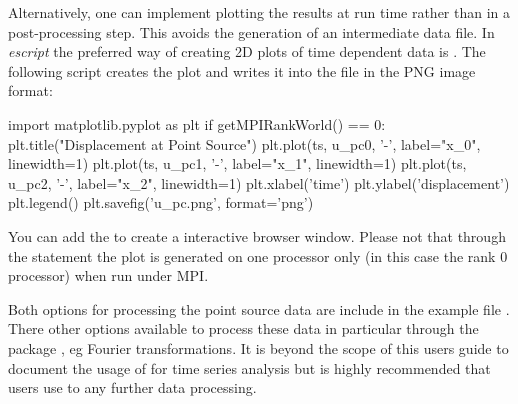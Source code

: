 Alternatively, one can implement plotting the results at run time rather than in a post-processing step. This avoids
the generation of an intermediate data file. In {\it escript} the preferred way of creating 2D plots of 
time dependent data is \MATPLOTLIB. The following script creates the plot and writes it into the 
file  in the PNG image format:
\begin{python}
import matplotlib.pyplot as plt
if getMPIRankWorld() == 0:
    plt.title("Displacement at Point Source")
    plt.plot(ts, u_pc0, '-', label="x_0", linewidth=1)
    plt.plot(ts, u_pc1, '-', label="x_1", linewidth=1)
    plt.plot(ts, u_pc2, '-', label="x_2", linewidth=1)
    plt.xlabel('time')
    plt.ylabel('displacement')
    plt.legend()
    plt.savefig('u_pc.png', format='png')
\end{python}
You can add the  to create a interactive browser window. Please not that 
through the  statement the plot is generated on one processor only (in this case the rank 0 processor) when run under MPI. 

Both options for processing the point source data are include in the example file . There other options available to process these data in particular through the \SCIPY package , eg Fourier transformations. It is beyond the scope of this users guide to document the usage of \SCIPY for time series analysis but is highly recommended that users  use \SCIPY to any further data processing.

